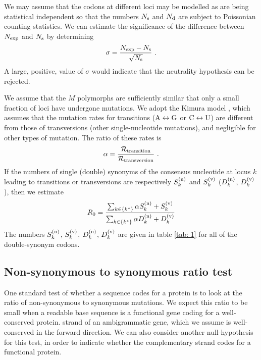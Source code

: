 \documentclass[unnumsec,webpdf,contemporary,large,namedate]{oup-authoring-template}%
\theoremstyle{thmstyleone}%
\theoremstyle{thmstyletwo}%
\theoremstyle{thmstylethree}%
\begin{document}
We may assume that the codons at different loci may be 
modelled as are being statistical independent so that the  
numbers $N_{\rm s}$ and $N_{\rm d}$ are subject to Poissonian 
counting statistics. We can estimate the significance of the difference 
between $N_{\rm exp}$ and $N_{\rm s}$ by determining
%
\begin{equation}
\label{eq: 3.5}
\sigma=\frac{N_{\rm exp}-N_{\rm s}}{\sqrt{N_{\rm s}}}
\ .
\end{equation}
%
A large, positive, value of $\sigma$ would indicate that the neutrality hypothesis 
can be rejected.

 We assume that the $M$ polymorphs are sufficiently similar
that only a small fraction of loci have undergone mutations. 
We adopt the Kimura model \citep{Kim80}, which assumes that the mutation
rates for transitions (${\rm A}\leftrightarrow {\rm G}$ or ${\rm C}\leftrightarrow{\rm U}$) are 
different from those of transversions (other single-nucleotide mutations), and negligible for 
other types of mutation. The ratio of these rates is  
%
\begin{equation}
\label{eq: 3.6}
\alpha=\frac{{\mathcal R}_{\rm transition}}{{\mathcal R}_{\rm transversion}}
\ .
\end{equation}
%
If the numbers of single (double) synonyms of the consensus nucleotide at locus $k$ leading to 
transitions or transversions are respectively $S^{({\rm n})}_k$ and $S^{({\rm v})}_k$ 
($D^{({\rm n})}_k$, $D^{({\rm v})}_k$), then we estimate
%
\begin{equation}
\label{eq: 3.7}
R_0=
\frac{\sum_{k\in\{k^\ast\}}\alpha S_k^{({\rm n})}+S^{({\rm v})}_k}
{\sum_{k\in\{k^\ast\}}\alpha D^{({\rm n})}_k+D_k^{({\rm v})}}
\end{equation}
%
The numbers $S^{({\rm n})}_k$, $S^{({\rm v})}_k$, $D^{({\rm n})}_k$, $D^{({\rm v})}_k$ are given 
in table \ref{tab: 1} for all of the double-synonym codons.

\subsection{Non-synonymous to synonymous ratio test}
\label{sec: 3.4}

One standard test of whether a sequence codes for a protein is to look at the 
ratio of non-synonymous to synonymous mutations. 
We expect this ratio to be small when a readable base sequence is a functional gene coding for 
a well-conserved protein.  strand 
of an ambigrammatic gene, which we assume is well-conserved in the forward direction. 
We can also consider another null-hypothesis for this test, in order to indicate whether the 
complementary strand codes for a functional protein. 
\end{document}
